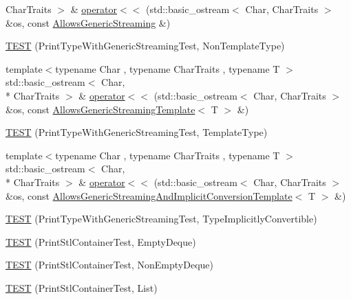 \begin{DoxyCompactItemize}
Char\-Traits $>$ \& \hyperlink{namespacetesting_1_1gtest__printers__test_a1eb0213095e639d357692066e8505887}{operator$<$$<$} (std\-::basic\-\_\-ostream$<$ Char, Char\-Traits $>$ \&os, const \hyperlink{classtesting_1_1gtest__printers__test_1_1_allows_generic_streaming}{Allows\-Generic\-Streaming} \&)
\item 
\hyperlink{namespacetesting_1_1gtest__printers__test_a9272037c799c4779e1d79476dad66cb6}{T\-E\-S\-T} (Print\-Type\-With\-Generic\-Streaming\-Test, Non\-Template\-Type)
\item 
{\footnotesize template$<$typename Char , typename Char\-Traits , typename T $>$ }\\std\-::basic\-\_\-ostream$<$ Char, \\*
Char\-Traits $>$ \& \hyperlink{namespacetesting_1_1gtest__printers__test_a5464168e925b1adf29986c8e544e908e}{operator$<$$<$} (std\-::basic\-\_\-ostream$<$ Char, Char\-Traits $>$ \&os, const \hyperlink{classtesting_1_1gtest__printers__test_1_1_allows_generic_streaming_template}{Allows\-Generic\-Streaming\-Template}$<$ T $>$ \&)
\item 
\hyperlink{namespacetesting_1_1gtest__printers__test_a6e180c85f307712a995985f7bc735fd1}{T\-E\-S\-T} (Print\-Type\-With\-Generic\-Streaming\-Test, Template\-Type)
\item 
{\footnotesize template$<$typename Char , typename Char\-Traits , typename T $>$ }\\std\-::basic\-\_\-ostream$<$ Char, \\*
Char\-Traits $>$ \& \hyperlink{namespacetesting_1_1gtest__printers__test_a09eedfbca613302efe6438d2a537f419}{operator$<$$<$} (std\-::basic\-\_\-ostream$<$ Char, Char\-Traits $>$ \&os, const \hyperlink{classtesting_1_1gtest__printers__test_1_1_allows_generic_streaming_and_implicit_conversion_template}{Allows\-Generic\-Streaming\-And\-Implicit\-Conversion\-Template}$<$ T $>$ \&)
\item 
\hyperlink{namespacetesting_1_1gtest__printers__test_a68877c5e1ec7a53281798310c30e1776}{T\-E\-S\-T} (Print\-Type\-With\-Generic\-Streaming\-Test, Type\-Implicitly\-Convertible)
\item 
\hyperlink{namespacetesting_1_1gtest__printers__test_a1ce10b8a3634e0f6bfbfbb5888c04a95}{T\-E\-S\-T} (Print\-Stl\-Container\-Test, Empty\-Deque)
\item 
\hyperlink{namespacetesting_1_1gtest__printers__test_a249d482cf4a1525bd043489dcbd3e200}{T\-E\-S\-T} (Print\-Stl\-Container\-Test, Non\-Empty\-Deque)
\item 
\hyperlink{namespacetesting_1_1gtest__printers__test_aaa135672ff79ecaef82c6046f2ab8d29}{T\-E\-S\-T} (Print\-Stl\-Container\-Test, List)

\end{DoxyCompactItemize}
